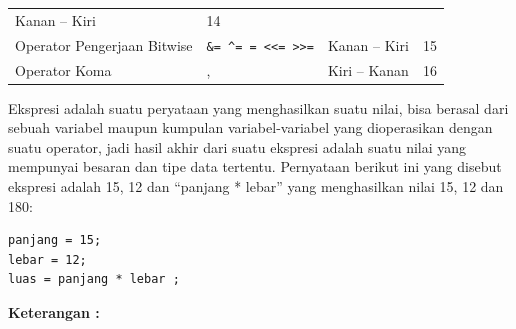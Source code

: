 \begin{longtable}[]{@{}llll@{}}
\begin{minipage}[t]{0.14\columnwidth}
Kanan -- Kiri
\strut\end{minipage} &
\begin{minipage}[t]{0.05\columnwidth}\raggedright\strut
14
\strut\end{minipage}\tabularnewline
\begin{minipage}[t]{0.52\columnwidth}\raggedright\strut
Operator Pengerjaan Bitwise
\strut\end{minipage} &
\begin{minipage}[t]{0.17\columnwidth}\raggedright\strut
\texttt{\&=\ \^{}=\ \textbar{}=\ \textless{}\textless{}=\ \textgreater{}\textgreater{}=}
\strut\end{minipage} &
\begin{minipage}[t]{0.14\columnwidth}\raggedright\strut
Kanan -- Kiri
\strut\end{minipage} &
\begin{minipage}[t]{0.05\columnwidth}\raggedright\strut
15
\strut\end{minipage}\tabularnewline
\begin{minipage}[t]{0.52\columnwidth}\raggedright\strut
Operator Koma
\strut\end{minipage} &
\begin{minipage}[t]{0.17\columnwidth}\raggedright\strut
,
\strut\end{minipage} &
\begin{minipage}[t]{0.14\columnwidth}\raggedright\strut
Kiri -- Kanan
\strut\end{minipage} &
\begin{minipage}[t]{0.05\columnwidth}\raggedright\strut
16
\strut\end{minipage}\tabularnewline
\bottomrule
\end{longtable}

Ekspresi adalah suatu peryataan yang menghasilkan suatu nilai, bisa
berasal dari sebuah variabel maupun kumpulan variabel-variabel yang
dioperasikan dengan suatu operator, jadi hasil akhir dari suatu ekspresi
adalah suatu nilai yang mempunyai besaran dan tipe data tertentu.
Pernyataan berikut ini yang disebut ekspresi adalah 15, 12 dan ``panjang
* lebar'' yang menghasilkan nilai 15, 12 dan 180:

\begin{verbatim}
panjang = 15;
lebar = 12;
luas = panjang * lebar ;
\end{verbatim}

\textbf{Keterangan :}

